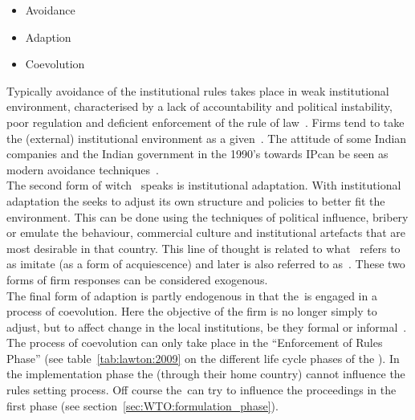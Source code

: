 \begin{itemize}
  \setlength{\itemsep}{5pt}
\item Avoidance
\item Adaption
\item Coevolution
\end{itemize}

Typically avoidance of the institutional rules takes place in weak institutional environment, characterised by a lack of accountability and political instability, poor regulation and deficient enforcement of the rule of law~\citep{Cantwell:2009hg}.
Firms tend to take the (external) institutional environment as a given~\citep{Cantwell:2009hg}. 
The attitude of some Indian \pharma companies and the Indian government in the 1990's towards \gls{IP}can be seen as modern avoidance techniques~\citep{Chittoor:2009jh,Times:2013}.\\
The second form of witch~\cite{Cantwell:2009hg} speaks is institutional adaptation. 
With institutional adaptation the \mne seeks to adjust its own structure and policies to better fit the environment. 
This can be done using the techniques of political influence, bribery or emulate the behaviour, commercial culture and institutional artefacts that are most desirable in that country. 
This line of thought is related to what~\cite{Oliver:1991tm} refers to as imitate (as a form of acquiescence) and later is also referred to as~\iso.
These two forms of firm responses can be considered exogenous. \\
The final form of adaption is partly endogenous in that the~\mne is engaged in a process of coevolution.
Here the objective of the firm is no longer simply to adjust, but to affect change in the local institutions, be they formal or informal~\citep{Cantwell:2009hg}.
The process of coevolution can only take place in the ``Enforcement of Rules Phase'' (see table~\ref{tab:lawton:2009} on the different life cycle phases of the \wto). 
In the implementation phase the \mne (through their home country) cannot influence the rules setting process.
Off course the~\mne can try to influence the proceedings in the first phase (see section~\ref{sec:WTO:formulation_phase}). 


